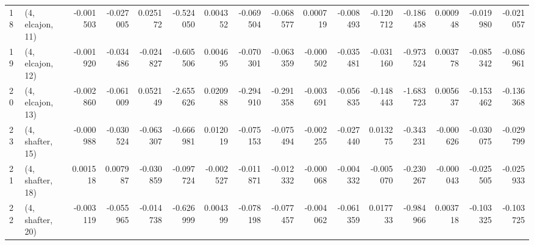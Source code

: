 \begin{tabular}{llrrrrrrrrrrrrrr}
18 &  (4, elcajon, 11) &  -0.001503 & -0.027005 &  0.025172 &  -0.524050 &  0.004352 &  -0.069504 & -0.068577 &  0.000719 & -0.008493 & -0.120712 &   -0.186458 &  0.000948 & -0.019980 & -0.021057 \\
19 &  (4, elcajon, 12) &  -0.001920 & -0.034486 & -0.024827 &  -0.605506 &  0.004695 &  -0.070301 & -0.063359 & -0.000502 & -0.035481 & -0.031160 &   -0.973524 &  0.003778 & -0.085342 & -0.086961 \\
20 &  (4, elcajon, 13) &  -0.002860 & -0.061009 &  0.052149 &  -2.655626 &  0.020988 &  -0.294910 & -0.291358 & -0.003691 & -0.056835 & -0.148443 &   -1.683723 &  0.005637 & -0.153462 & -0.136368 \\
23 &  (4, shafter, 15) &  -0.000988 & -0.030524 & -0.063307 &  -0.666981 &  0.012019 &  -0.075153 & -0.075494 & -0.002255 & -0.027440 &  0.013275 &   -0.343231 & -0.000626 & -0.030075 & -0.029799 \\
21 &  (4, shafter, 18) &   0.001518 &  0.007987 & -0.030859 &  -0.097724 & -0.002527 &  -0.011871 & -0.012332 & -0.000068 & -0.004332 & -0.005070 &   -0.230267 & -0.000043 & -0.025505 & -0.025933 \\
22 &  (4, shafter, 20) &  -0.003119 & -0.055965 & -0.014738 &  -0.626999 &  0.004399 &  -0.078198 & -0.077457 & -0.004062 & -0.061359 &  0.017733 &   -0.984966 &  0.003718 & -0.103325 & -0.103725 \\
\bottomrule
\end{tabular}
